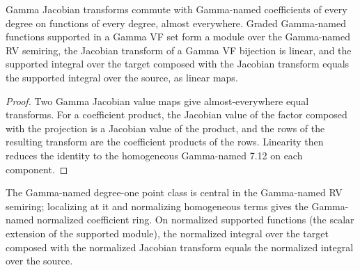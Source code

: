 \begin{theorem}

\label{s7-gn-12-linear}


\leanok

Gamma Jacobian transforms commute with Gamma-named coefficients of every degree on functions of every degree, almost everywhere. Graded Gamma-named functions supported in a Gamma VF set form a module over the Gamma-named RV semiring, the Jacobian transform of a Gamma VF bijection is linear, and the supported integral over the target composed with the Jacobian transform equals the supported integral over the source, as linear maps.

\end{theorem}

\begin{proof}


\leanok

Two Gamma Jacobian value maps give almost-everywhere equal transforms. For a coefficient product, the Jacobian value of the factor composed with the projection is a Jacobian value of the product, and the rows of the resulting transform are the coefficient products of the rows. Linearity then reduces the identity to the homogeneous Gamma-named 7.12 on each component.

\end{proof}

\begin{theorem}

\label{s7-gn-15-normalized}


\leanok

The Gamma-named degree-one point class is central in the Gamma-named RV semiring; localizing at it and normalizing homogeneous terms gives the Gamma-named normalized coefficient ring. On normalized supported functions (the scalar extension of the supported module), the normalized integral over the target composed with the normalized Jacobian transform equals the normalized integral over the source.

\end{theorem}

